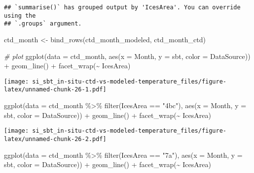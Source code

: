 \documentclass[
]{article}
\newenvironment{Shaded}{\begin{snugshade}}{\end{snugshade}}
\newcommand{\AttributeTok}[1]{\textcolor[rgb]{0.77,0.63,0.00}{#1}}
\newcommand{\CommentTok}[1]{\textcolor[rgb]{0.56,0.35,0.01}{\textit{#1}}}
\newcommand{\FunctionTok}[1]{\textcolor[rgb]{0.00,0.00,0.00}{#1}}
\newcommand{\NormalTok}[1]{#1}
\newcommand{\OtherTok}[1]{\textcolor[rgb]{0.56,0.35,0.01}{#1}}
\newcommand{\SpecialCharTok}[1]{\textcolor[rgb]{0.00,0.00,0.00}{#1}}
\newcommand{\StringTok}[1]{\textcolor[rgb]{0.31,0.60,0.02}{#1}}
\begin{document}
\begin{verbatim}
## `summarise()` has grouped output by 'IcesArea'. You can override using the
## `.groups` argument.
\end{verbatim}

\begin{Shaded}
\begin{Highlighting}[]
\NormalTok{ctd\_month }\OtherTok{\textless{}{-}} \FunctionTok{bind\_rows}\NormalTok{(ctd\_month\_modeled, ctd\_month\_ctd)}

\CommentTok{\# plot}
\FunctionTok{ggplot}\NormalTok{(}\AttributeTok{data =}\NormalTok{ ctd\_month, }\FunctionTok{aes}\NormalTok{(}\AttributeTok{x =}\NormalTok{ Month, }\AttributeTok{y =}\NormalTok{ sbt, }\AttributeTok{color =}\NormalTok{ DataSource)) }\SpecialCharTok{+} \FunctionTok{geom\_line}\NormalTok{() }\SpecialCharTok{+} \FunctionTok{facet\_wrap}\NormalTok{(}\SpecialCharTok{\textasciitilde{}}\NormalTok{ IcesArea)}
\end{Highlighting}
\end{Shaded}

\texttt{[image: si\_sbt\_in-situ-ctd-vs-modeled-temperature\_files/figure-latex/unnamed-chunk-26-1.pdf]}

\begin{Shaded}
\begin{Highlighting}[]
\FunctionTok{ggplot}\NormalTok{(}\AttributeTok{data =}\NormalTok{ ctd\_month }\SpecialCharTok{\%\textgreater{}\%} \FunctionTok{filter}\NormalTok{(IcesArea }\SpecialCharTok{==} \StringTok{"4bc"}\NormalTok{), }\FunctionTok{aes}\NormalTok{(}\AttributeTok{x =}\NormalTok{ Month, }\AttributeTok{y =}\NormalTok{ sbt, }\AttributeTok{color =}\NormalTok{ DataSource)) }\SpecialCharTok{+} \FunctionTok{geom\_line}\NormalTok{() }\SpecialCharTok{+} \FunctionTok{facet\_wrap}\NormalTok{(}\SpecialCharTok{\textasciitilde{}}\NormalTok{ IcesArea)}
\end{Highlighting}
\end{Shaded}

\texttt{[image: si\_sbt\_in-situ-ctd-vs-modeled-temperature\_files/figure-latex/unnamed-chunk-26-2.pdf]}

\begin{Shaded}
\begin{Highlighting}[]
\FunctionTok{ggplot}\NormalTok{(}\AttributeTok{data =}\NormalTok{ ctd\_month }\SpecialCharTok{\%\textgreater{}\%} \FunctionTok{filter}\NormalTok{(IcesArea }\SpecialCharTok{==} \StringTok{"7a"}\NormalTok{), }\FunctionTok{aes}\NormalTok{(}\AttributeTok{x =}\NormalTok{ Month, }\AttributeTok{y =}\NormalTok{ sbt, }\AttributeTok{color =}\NormalTok{ DataSource)) }\SpecialCharTok{+} \FunctionTok{geom\_line}\NormalTok{() }\SpecialCharTok{+} \FunctionTok{facet\_wrap}\NormalTok{(}\SpecialCharTok{\textasciitilde{}}\NormalTok{ IcesArea)}
\end{Highlighting}
\end{Shaded}
\end{document}

